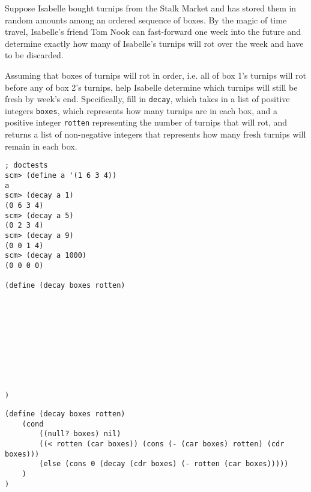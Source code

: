 \begin{blocksection}
\question
Suppose Isabelle bought turnips from the Stalk Market and has stored them in random amounts among an ordered sequence of boxes. By the magic of time travel, Isabelle's friend Tom Nook can fast-forward one week into the future and determine exactly how many of Isabelle's turnips will rot over the week and have to be discarded.

Assuming that boxes of turnips will rot in order, i.e. all of box 1's turnips will rot before any of box 2's turnips, help Isabelle determine which turnips will still be fresh by week's end. Specifically, fill in \lstinline{decay}, which takes in a list of positive integers \lstinline{boxes}, which represents how many turnips are in each box, and a positive integer \lstinline{rotten} representing the number of turnips that will rot, and returns a list of non-negative integers that represents how many fresh turnips will remain in each box.

\begin{lstlisting}
; doctests
scm> (define a '(1 6 3 4))
a
scm> (decay a 1)
(0 6 3 4)
scm> (decay a 5)
(0 2 3 4)
scm> (decay a 9)
(0 0 1 4)
scm> (decay a 1000)
(0 0 0 0)

(define (decay boxes rotten)










)
\end{lstlisting}
\end{blocksection}
\begin{blocksection}
\begin{solution}
\begin{lstlisting}
(define (decay boxes rotten)
    (cond 
        ((null? boxes) nil)
        ((< rotten (car boxes)) (cons (- (car boxes) rotten) (cdr boxes)))
        (else (cons 0 (decay (cdr boxes) (- rotten (car boxes)))))
    )
)
\end{lstlisting}
\end{solution}
\end{blocksection}
